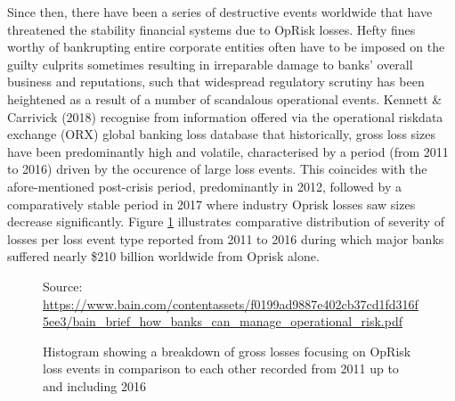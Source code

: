 \documentclass{DissertateUSU}
\begin{document}
Since then, there have been a series of destructive events worldwide
that have threatened the stability financial systems due to OpRisk
losses. Hefty fines worthy of bankrupting entire corporate entities
often have to be imposed on the guilty culprits sometimes resulting in
irreparable damage to banks' overall business and reputations, such that
widespread regulatory scrutiny has been heightened as a result of a
number of scandalous operational events. Kennett \& Carrivick (2018)
recognise from information offered via the operational riskdata exchange
(ORX) global banking loss database that historically, gross loss sizes
have been predominantly high and volatile, characterised by a period
(from 2011 to 2016) driven by the occurence of large loss events. This
coincides with the afore-mentioned post-crisis period, predominantly in
2012, followed by a comparatively stable period in 2017 where industry
Oprisk losses saw sizes decrease significantly. Figure
\ref{bank-oprisk_fig} illustrates comparative distribution of severity
of losses per loss event type reported from 2011 to 2016 during which
major banks suffered nearly \$210 billion worldwide from Oprisk
alone.\medskip

\begin{figure}
\centering
{}
             {Source: \url{https://www.bain.com/contentassets/f0199ad9887e402cb37cd1fd316f5ee3/bain_brief_how_banks_can_manage_operational_risk.pdf}}
\caption[Losses suffered from 2011 to 2016 from Oprisk]{Histogram showing a breakdown of gross losses focusing on OpRisk loss events in comparison to each other recorded from 2011 up to and including 2016}
\label{bank-oprisk_fig}
\end{figure}
\end{document}
